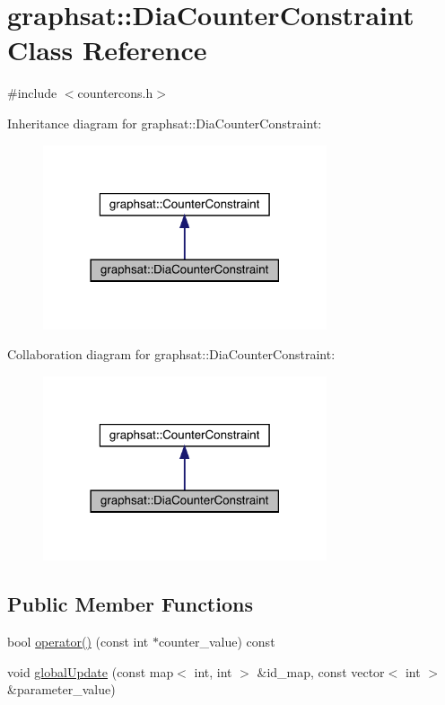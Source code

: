\hypertarget{classgraphsat_1_1_dia_counter_constraint}{}\section{graphsat\+::Dia\+Counter\+Constraint Class Reference}
\label{classgraphsat_1_1_dia_counter_constraint}


{\ttfamily \#include $<$countercons.\+h$>$}



Inheritance diagram for graphsat\+::Dia\+Counter\+Constraint\+:\nopagebreak
\begin{figure}[H]
\begin{center}
\leavevmode
\includegraphics[width=237pt]{classgraphsat_1_1_dia_counter_constraint__inherit__graph}
\end{center}
\end{figure}


Collaboration diagram for graphsat\+::Dia\+Counter\+Constraint\+:\nopagebreak
\begin{figure}[H]
\begin{center}
\leavevmode
\includegraphics[width=237pt]{classgraphsat_1_1_dia_counter_constraint__coll__graph}
\end{center}
\end{figure}
\subsection*{Public Member Functions}
\begin{DoxyCompactItemize}
\item 
bool \mbox{\hyperlink{classgraphsat_1_1_dia_counter_constraint_a31a8b26714bab4aca765556272dae334}{operator()}} (const int $\ast$counter\+\_\+value) const
\item 
void \mbox{\hyperlink{classgraphsat_1_1_dia_counter_constraint_a75319d3a2b1cf2db7cf540b732729871}{global\+Update}} (const map$<$ int, int $>$ \&id\+\_\+map, const vector$<$ int $>$ \&parameter\+\_\+value)
\end{DoxyCompactItemize}
